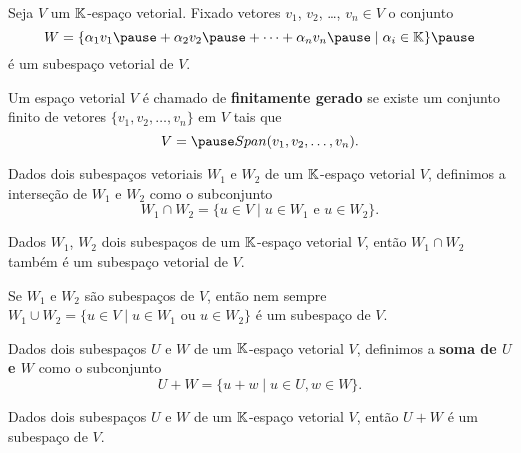 \documentclass{beamer}
\begin{document}
\begin{frame}
	\begin{proposicao}
		Seja $V$ um $\mathbb{K}$-espaço vetorial. \pause Fixado vetores $v_1$, $v_2$, \dots, $v_n \in V$ \pause o conjunto
		\[
			W = \{\alpha_1v_1 \pause + \alpha_2v_2 \pause + \cdots + \alpha_nv_n \pause \mid \alpha_i \in \cp{K}\}\pause
		\]
		é um subespaço vetorial de $V$.
	\end{proposicao}
\end{frame}

\begin{frame}
	\begin{definicao}
		Um espaço vetorial $V$ é chamado de \textbf{finitamente gerado} \pause se existe um conjunto finito \pause de vetores $\{v_1, v_2, \dots, v_n\}$ em $V$ \pause tais que\pause
		\[
			V = \pause Span(v_1, v_2, \dots, v_n).
		\]
	\end{definicao}
\end{frame}

\begin{frame}
	\begin{definicao}
		Dados dois subespaços vetoriais $W_1$ e $W_2$ de um $\mathbb{K}$-espaço vetorial $V$, definimos a interseção de $W_1$ e $W_2$ como o subconjunto
		\[
			W_1 \cap W_2 = \{u \in V \mid u\in W_1 \mbox{ e } u \in W_2\}.
		\]	
	\end{definicao}
	
	\vspace{1cm}
	
	\begin{teorema}
		Dados $W_1$, $W_2$ dois subespaços de um $\mathbb{K}$-espaço vetorial $V$, então $W_1 \cap W_2$ também é um subespaço vetorial de $V$.
	\end{teorema}
\end{frame}

\begin{frame}
	\begin{observacao}
		Se $W_1$ e $W_2$ são subespaços de $V$, então nem sempre $W_1 \cup W_2 = \{u \in V \mid u \in W_1 \mbox{ ou } u \in W_2\}$ é um subespaço de $V$.
	\end{observacao}
\end{frame}

\begin{frame}
	\begin{definicao}
		Dados dois subespaços $U$ e $W$ de um $\mathbb{K}$-espaço vetorial $V$, definimos a \textbf{soma de $U$ e $W$} como o subconjunto
		\[
			U + W = \{u + w \mid u \in U, w \in W\}.
		\]
	\end{definicao}
	
	\vspace*{1cm}
	
	\begin{teorema}
		Dados dois subespaços $U$ e $W$ de um $\mathbb{K}$-espaço vetorial $V$, então $U + W$ é um subespaço de $V$.
	\end{teorema}
\end{frame}
\end{document}
